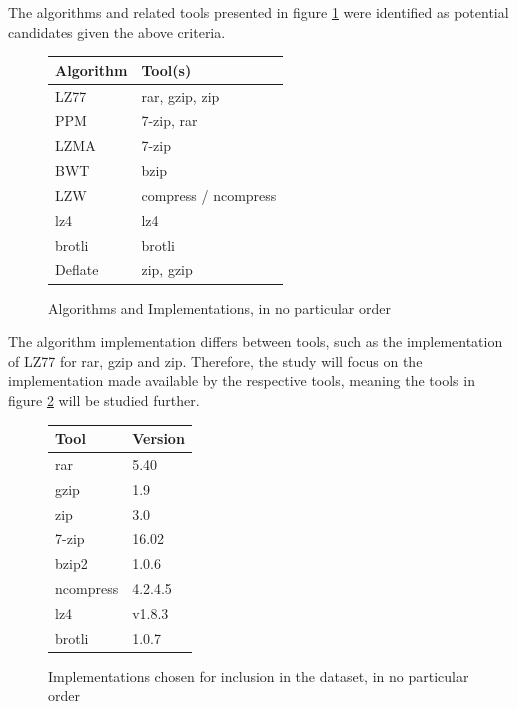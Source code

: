 \documentclass[conference]{IEEEtran}
\begin{document}
The algorithms and related tools presented in figure \ref{fig:method:algorithms} were identified as potential candidates given the above criteria.

\begin{figure}[H]
    \centering
    \begin{tabular}{l|l}
        Algorithm & Tool(s)\\
        \hline
        LZ77 & rar, gzip, zip\cite{HORNEY2013,KONECKI2011} \\
        PPM & 7-zip, rar\cite{HORNEY2013, KONECKI2011} \\
        LZMA & 7-zip\cite{HORNEY2013, KONECKI2011} \\
        BWT & bzip\cite{HORNEY2013, KONECKI2011} \\
        LZW & compress / ncompress\cite{HORNEY2013, KONECKI2011} \\
        lz4 & lz4\footnotemark\\
        brotli & brotli\footnotemark \\
        Deflate & zip, gzip\cite{HORNEY2013} \\
    \end{tabular}
    \caption{Algorithms and Implementations, in no particular order}
    \label{fig:method:algorithms}
\end{figure}
\addtocounter{footnote}{-2}
\addtocounter{footnote}{1}
\addtocounter{footnote}{1}

The algorithm implementation differs between tools, such as the implementation of LZ77 for rar, gzip and zip\cite{HORNEY2013}. Therefore, the study will focus on the implementation made available by the respective tools, meaning the tools in figure \ref{fig:method:algorithms2} will be studied 
further.

\begin{figure}[H]
    \centering
    \begin{tabular}{l|l}
        Tool & Version\\
        \hline
        rar & 5.40 \\
        gzip & 1.9 \\
        zip & 3.0 \\
        7-zip & 16.02 \\
        bzip2 & 1.0.6 \\
        ncompress & 4.2.4.5 \\
        lz4 & v1.8.3 \\
        brotli & 1.0.7
    \end{tabular}
    \caption{Implementations chosen for inclusion in the dataset, in no particular order}
    \label{fig:method:algorithms2}
\end{figure}
\end{document}
